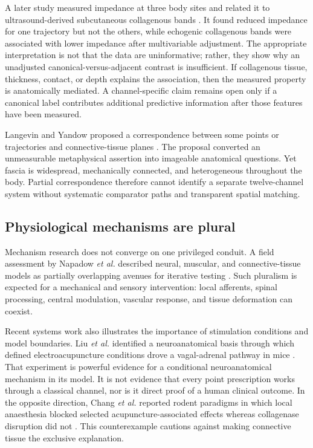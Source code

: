 \documentclass[conference]{IEEEtran}
\begin{document}
A later study measured impedance at three body sites and related it to ultrasound-derived subcutaneous collagenous bands \cite{ahn2010}. It found reduced impedance for one trajectory but not the others, while echogenic collagenous bands were associated with lower impedance after multivariable adjustment. The appropriate interpretation is not that the data are uninformative; rather, they show why an unadjusted canonical-versus-adjacent contrast is insufficient. If collagenous tissue, thickness, contact, or depth explains the association, then the measured property is anatomically mediated. A channel-specific claim remains open only if a canonical label contributes additional predictive information after those features have been measured.

Langevin and Yandow proposed a correspondence between some points or trajectories and connective-tissue planes \cite{langevin2002}. The proposal converted an unmeasurable metaphysical assertion into imageable anatomical questions. Yet fascia is widespread, mechanically connected, and heterogeneous throughout the body. Partial correspondence therefore cannot identify a separate twelve-channel system without systematic comparator paths and transparent spatial matching.

\subsection{Physiological mechanisms are plural}

Mechanism research does not converge on one privileged conduit. A field assessment by Napadow \emph{et al.} described neural, muscular, and connective-tissue models as partially overlapping avenues for iterative testing \cite{napadow2008}. Such pluralism is expected for a mechanical and sensory intervention: local afferents, spinal processing, central modulation, vascular response, and tissue deformation can coexist.

Recent systems work also illustrates the importance of stimulation conditions and model boundaries. Liu \emph{et al.} identified a neuroanatomical basis through which defined electroacupuncture conditions drove a vagal-adrenal pathway in mice \cite{liu2021}. That experiment is powerful evidence for a conditional neuroanatomical mechanism in its model. It is not evidence that every point prescription works through a classical channel, nor is it direct proof of a human clinical outcome. In the opposite direction, Chang \emph{et al.} reported rodent paradigms in which local anaesthesia blocked selected acupuncture-associated effects whereas collagenase disruption did not \cite{chang2019}. This counterexample cautions against making connective tissue the exclusive explanation.
\end{document}
